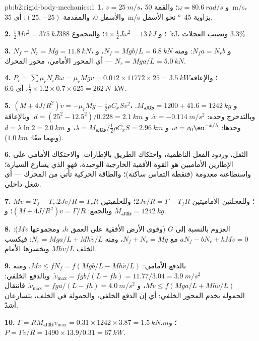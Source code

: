\begin{solution}{pb:b2:rigid-body-mechanics:1}
\textbf{1.} $v = \qty{25}{m/s}$، و $\omega = \qty{80.6}{rad/s}$؛ والقمة \qty{50}{m/s}،
والأسفل $0$، والمقدمة $(25, -25)$: أي \qty{35}{m/s} بزاوية \qty{45}{\degree} نحو الأسفل.

\textbf{2.} $\tfrac12Mv^2 = \qty{375}{kJ}$؛ و $4 \times \tfrac12J\omega^2 = \qty{13}{kJ}$؛
والمجموع \qty{388}{kJ}، ونصيب العجلات $3.3\%$.

\textbf{3.} $N_f + N_r = Mg = \qty{11.8}{kN}$، و $N_fa = N_rb$: ومنه $N_f = Mgb/L =
\qty{6.8}{kN}$، و $N_r = Mga/L = \qty{5.0}{kN}$ --- أي المحور الأمامي، محور المحرك.

\textbf{4.} $P_r = \sum\mu_rN_iR\omega = \mu_rMgv = 0.012 \times 11772 \times 25 =
\qty{3.5}{kW}$؛ والإعاقة $\tfrac12 \times 1.2 \times 0.7 \times 625 = \qty{262}{N}$، أي \qty{6.6}{kW}.

\textbf{5.} $(M + 4J/R^2)\dot v = -\mu_rMg - \tfrac12\rho C_xSv^2$، و $M_{\text{فعّالة}} =
1200 + 41.6 = \qty{1242}{kg}$. وبالتدحرج وحده: $\dot v = \qty{-0.114}{m/s^2}$،
و $d = (25^2 - 12.5^2)/0.228 = \qty{2.1}{km}$. وبالإعاقة وحدها: $v = v_0\eu^{-x/\lambda}$،
و $\lambda = M_{\text{فعّالة}}/\tfrac12\rho C_xS = \qty{2.96}{km}$، و $d = \lambda\ln2 =
\qty{2.0}{km}$ (وبهما معًا: $\qty{1.0}{km}$).

\textbf{6.} الثقل، وردود الفعل الناظمية، واحتكاك الطريق بالإطارات.
والاحتكاك الأمامي على الإطارين الأماميين هو القوة الأفقية
الخارجية الوحيدة، فهو الذي يسارع السيارة؛ واستطاعته معدومة
(فنقطة التماس ساكنة)؛ والطاقة الحركية تأتي من المحرك --- أي شغل داخلي.

\textbf{7.} $M\dot v = T_f - T_r$؛ وللعجلتين الأماميتين $2J\dot v/R = \Gamma - T_fR$؛
وللخلفيتين $2J\dot v/R = T_rR$. وبالجمع: $(M + 4J/R^2)\dot v = \Gamma/R$؛
و $M_{\text{فعّالة}} = \qty{1242}{kg}$.

\textbf{8.} العزوم بالنسبة إلى $G$ (وقوى الأرض الأفقية على العمق $h$،
ومجموعها $M\dot v$): $aN_f - bN_r + hM\dot v = 0$ مع $N_f + N_r = Mg$، ومنه
$N_r = Mga/L + Mh\dot v/L$: فيكسب الخلف $Mh\dot v/L$ ويخسرها الأمام.

\textbf{9.} بالدفع الأمامي: $M\dot v \le fN_f = f(Mgb/L - Mh\dot v/L)$، ومنه
$\dot v_{\max} = fgb/(L + fh) = 11.77/3.04 = \qty{3.9}{m/s^2}$. وبالدفع الخلفي:
$M\dot v \le f(Mga/L + Mh\dot v/L)$، و $\dot v_{\max} = fga/(L - fh) = \qty{4.0}{m/s^2}$.
فانتقال الحمولة يخدم المحور الخلفي: أي إن الدفع الخلفي، والحمولة
في الخلف، يتسارعان أشدّ.

\textbf{10.} $\Gamma = RM_{\text{فعّالة}}\dot v_{\max} = 0.31 \times 1242 \times 3.87 =
\qty{1.5}{kN.m}$؛ و $P = \Gamma v/R = 1490 \times 13.9/0.31 = \qty{67}{kW}$.


\end{solution}
